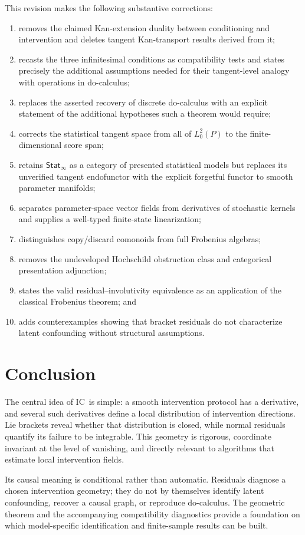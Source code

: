 \documentclass{article}
\theoremstyle{plain}
\theoremstyle{definition}
\theoremstyle{remark}
\newcommand{\StatInf}{\mathsf{Stat}_{\infty}}
\newcommand{\IC}{\textsc{IC}}
\begin{document}
This revision makes the following substantive corrections:
\begin{enumerate}[leftmargin=*,itemsep=2pt]
  \item removes the claimed Kan-extension duality between conditioning and
        intervention and deletes tangent Kan-transport results derived from it;
  \item recasts the three infinitesimal conditions as compatibility tests and
        states precisely the additional assumptions needed for their
        tangent-level analogy with operations in do-calculus;
  \item replaces the asserted recovery of discrete do-calculus with an explicit
        statement of the additional hypotheses such a theorem would require;
  \item corrects the statistical tangent space from all of \(L_0^2(P)\) to the
        finite-dimensional score span;
  \item retains \(\StatInf\) as a category of presented statistical models but
        replaces its unverified tangent endofunctor with the explicit
        forgetful functor to smooth parameter manifolds;
  \item separates parameter-space vector fields from derivatives of stochastic
        kernels and supplies a well-typed finite-state linearization;
  \item distinguishes copy/discard comonoids from full Frobenius algebras;
  \item removes the undeveloped Hochschild obstruction class and categorical
        presentation adjunction;
  \item states the valid residual--involutivity equivalence as an application of
        the classical Frobenius theorem; and
  \item adds counterexamples showing that bracket residuals do not characterize
        latent confounding without structural assumptions.
\end{enumerate}

\section{Conclusion}

The central idea of \IC\ is simple: a smooth intervention
protocol has a derivative, and several such derivatives define a local
distribution of intervention directions.  Lie brackets reveal whether that
distribution is closed, while normal residuals quantify its failure to be
integrable.  This geometry is rigorous, coordinate invariant at the level of
vanishing, and directly relevant to algorithms that estimate local intervention
fields.

Its causal meaning is conditional rather than automatic.  Residuals diagnose a
chosen intervention geometry; they do not by themselves identify latent
confounding, recover a causal graph, or reproduce do-calculus.  The geometric
theorem and the accompanying compatibility diagnostics provide a foundation on
which model-specific identification and finite-sample results can be built.



\end{document}
